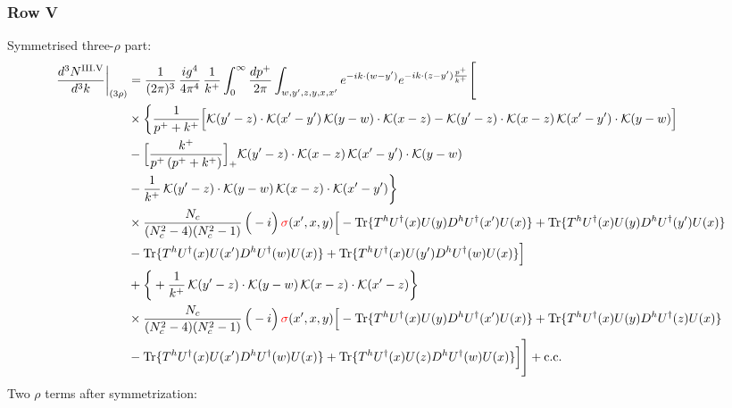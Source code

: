 \documentclass[9pt]{article}
\numberwithin{equation}{section}
\begin{document}
\subsubsection*{Row V}
Symmetrised three-$\rho$ part:
\begin{align}
\frac{d^{3}N^{\rm III.V}}{d^{3}k}\bigg|_{(3\rho)} &=\frac{1}{(2\pi)^{3}}\,\frac{ig^{4}}{4\pi^{4}}\,\frac{1}{k^{+}}\int_{0}^{\infty}\frac{dp^{+}}{2\pi}\int_{w,y',z,y,x,x'}e^{-ik\cdot(w-y')}e^{-ik\cdot(z-y')\frac{p^{+}}{k^{+}}}\Bigg[\notag\\
&\times\bigg\{\frac{1}{p^{+}+k^{+}}\Big[\mathcal{K}(y'-z)\cdot\mathcal{K}(x'-y')\,\mathcal{K}(y-w)\cdot\mathcal{K}(x-z)-\mathcal{K}(y'-z)\cdot\mathcal{K}(x-z)\,\mathcal{K}(x'-y')\cdot\mathcal{K}(y-w)\Big]\notag\\
&-\Big[\frac{k^{+}}{p^{+}\,(p^{+}+k^{+})}\Big]_{+}\mathcal{K}(y'-z)\cdot\mathcal{K}(x-z)\,\mathcal{K}(x'-y')\cdot\mathcal{K}(y-w)\notag\\
&-\frac{1}{k^{+}}\,\mathcal{K}(y'-z)\cdot\mathcal{K}(y-w)\,\mathcal{K}(x-z)\cdot\mathcal{K}(x'-y')\bigg\}\notag\\
&\times \frac{N_{c}}{(N_{c}^{2}-4)(N_{c}^{2}-1)}\,\Big(-i\Big)\,{\color{red}\sigma}(x',x,y)\Big[-{\rm Tr}\{T^{h}U^{\dagger}(x)U(y)D^{h}U^{\dagger}(x')U(x)\}+{\rm Tr}\{T^{h}U^{\dagger}(x)U(y)D^{h}U^{\dagger}(y')U(x)\}\notag\\
& -{\rm Tr}\{T^{h}U^{\dagger}(x)U(x')D^{h}U^{\dagger}(w)U(x)\}+{\rm Tr}\{T^{h}U^{\dagger}(x)U(y')D^{h}U^{\dagger}(w)U(x)\}\Big]\notag\\
&+\bigg\{+\frac{1}{k^{+}}\,\mathcal{K}(y'-z)\cdot\mathcal{K}(y-w)\,\mathcal{K}(x-z)\cdot\mathcal{K}(x'-z)\bigg\}\notag\\
&\times \frac{N_{c}}{(N_{c}^{2}-4)(N_{c}^{2}-1)}\,\Big(-i\Big)\,{\color{red}\sigma}(x',x,y)\Big[-{\rm Tr}\{T^{h}U^{\dagger}(x)U(y)D^{h}U^{\dagger}(x')U(x)\}+{\rm Tr}\{T^{h}U^{\dagger}(x)U(y)D^{h}U^{\dagger}(z)U(x)\}\notag\\
& -{\rm Tr}\{T^{h}U^{\dagger}(x)U(x')D^{h}U^{\dagger}(w)U(x)\}+{\rm Tr}\{T^{h}U^{\dagger}(x)U(z)D^{h}U^{\dagger}(w)U(x)\}\Big]\Bigg]+{\rm c.c.}\label{eq:E-III.V-3}
\end{align}
Two $\rho$ terms after symmetrization: 
\end{document}

